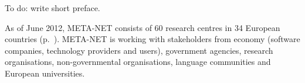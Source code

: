 %                                                                             
%
%
% 



\maketitle


\null
\pagestyle{empty} 

\setcounter{page}{3}
\pagestyle{scrheadings}

To do: write short preface.

\bigskip As of June 2012, META-NET consists of 60 research centres in 34 European countries (p.~\pageref{metanetmembers}). META-NET is working with stakeholders from economy (software companies, technology providers and users), government agencies, research organisations, non-governmental organisations, language communities and European universities. 

\clearpage

\makefundingnotice

\cleardoublepage



\renewcommand\contentsname{}
\tableofcontents


\cleardoublepage


